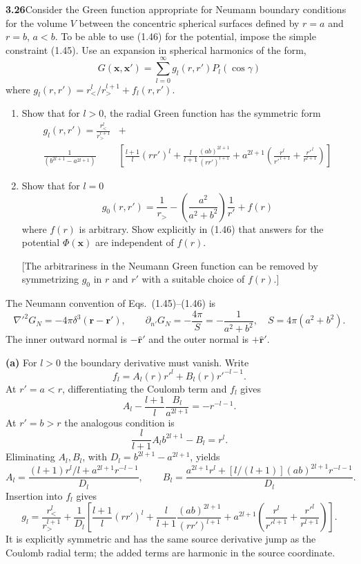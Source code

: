 \par\bigskip
\noindent\textbf{3.26}\quad Consider the Green function appropriate for Neumann boundary conditions for the volume $V$ between the concentric spherical surfaces defined by $r=a$ and $r=b$, $a<b$. To be able to use (1.46) for the potential, impose the simple constraint (1.45). Use an expansion in spherical harmonics of the form,
\[
G(\mathbf{x},\mathbf{x}')=\sum_{l=0}^{\infty}g_{l}(r,r')P_{l}(\cos\gamma)
\]
where $g_{l}(r,r')=r_{<}^{l}/r_{>}^{l+1}+f_{l}(r,r')$.
\begin{enumerate}
\item[(a)] Show that for $l>0$, the radial Green function has the symmetric form
\begin{align*}
g_{l}(r,r')=\frac{r_{<}^{l}}{r_{>}^{l+1}}&+\\
\frac{1}{(b^{2l+1}-a^{2l+1})}&\left[\frac{l+1}{l}(rr')^{l}+\frac{l}{l+1}\frac{(ab)^{2l+1}}{(rr')^{l+1}}+a^{2l+1}\!\left(\frac{r^{l}}{r'^{\,l+1}}+\frac{r'^{\,l}}{r^{l+1}}\right)\right]
\end{align*}
\item[(b)] Show that for $l=0$
\[
g_{0}(r,r')=\frac{1}{r_{>}}-\left(\frac{a^{2}}{a^{2}+b^{2}}\right)\frac{1}{r'}+f(r)
\]
where $f(r)$ is arbitrary. Show explicitly in (1.46) that answers for the potential $\Phi(\mathbf{x})$ are independent of $f(r)$.

[The arbitrariness in the Neumann Green function can be removed by symmetrizing $g_{0}$ in $r$ and $r'$ with a suitable choice of $f(r)$.]
\end{enumerate}
\solution

The Neumann convention of Eqs.~(1.45)--(1.46) is
\[
\nabla'^2G_N=-4\pi\delta^3(\mathbf r-\mathbf r'),\qquad
\partial_{n'}G_N=-\frac{4\pi}{S}
=-\frac1{a^2+b^2},\quad S=4\pi(a^2+b^2).
\]
The inner outward normal is $-\hat{\mathbf r}'$ and the outer
normal is $+\hat{\mathbf r}'$.

\textbf{(a)} For $l>0$ the boundary derivative must vanish.  Write
\[
f_l=A_l(r)r'^l+B_l(r)r'^{-l-1}.
\]
At $r'=a<r$, differentiating the Coulomb term and $f_l$ gives
\[
A_l-\frac{l+1}{l}\frac{B_l}{a^{2l+1}}=-r^{-l-1}.
\]
At $r'=b>r$ the analogous condition is
\[
\frac l{l+1}A_lb^{2l+1}-B_l=r^l.
\]
Eliminating $A_l,B_l$, with $D_l=b^{2l+1}-a^{2l+1}$, yields
\[
A_l=\frac{(l+1)r^l/l+a^{2l+1}r^{-l-1}}{D_l},\qquad
B_l=\frac{a^{2l+1}r^l+[l/(l+1)](ab)^{2l+1}r^{-l-1}}{D_l}.
\]
Insertion into $f_l$ gives
\[
\boxed{g_l=\frac{r_<^l}{r_>^{l+1}}+\frac1{D_l}
\left[\frac{l+1}{l}(rr')^l+
\frac l{l+1}\frac{(ab)^{2l+1}}{(rr')^{l+1}}
+a^{2l+1}\left(\frac{r^l}{r'^{l+1}}+
\frac{r'^l}{r^{l+1}}\right)\right].}
\]
It is explicitly symmetric and has the same source derivative jump
as the Coulomb radial term; the added terms are harmonic in the
source coordinate.

